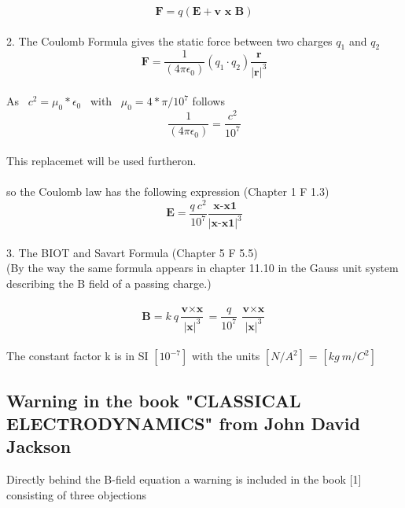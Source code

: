 \documentclass[10pt,titlepage]{article}
\begin{document}
\begin{equation}
\textbf{F} = q(\textbf{E}+\textbf{v }\textbf{x}\textbf{ B})
\end{equation}
\\
2. The Coulomb Formula gives the static force between two charges $q_1$ and $q_2$ 
\\
\begin{equation}
\textbf{F} = \frac{1}{(4\pi \epsilon_0)} (q_1 \cdot q_2)\frac{\textbf{r}}{\vert\textbf{r}\vert^3}
\end{equation}
\\
As \ $c^2=\mu_0* \epsilon_0$ \ with \ $ \mu_0=4*\pi/10^7$ follows
\begin{equation}
\frac{1}{(4\pi \epsilon_0)}=\frac{c^2}{10^7}
\end{equation}\\
This replacemet will be used furtheron.
\\\\
so the Coulomb law has the following expression (Chapter 1  F 1.3)
\begin{equation}
\textbf{E} = \frac{ q \ c^2}{10^7}\frac{\textbf{x-x1}}{\vert\textbf{x-x1}\vert^3}
\end{equation}\\


3. The BIOT and Savart Formula (Chapter 5  F 5.5)
\\(By the way the same formula appears in chapter 11.10 in the Gauss unit system describing the B field of a passing charge.)\\
\\
\begin{equation}
\textbf{B} = k \ q \frac{\textbf{v} \times \textbf{x}}{\vert\textbf{x}\vert^3} = \frac{q}{10^{7}} \ \frac{\textbf{v} \times \textbf{x}}{\vert\textbf{x}\vert^3}
\end{equation}
\\
The constant factor k is in SI  $[10^{-7}]$ with the units $[N/A^2]$ =  $[kg \ m/C^2]$
\\


\subsection{Warning in the book "CLASSICAL ELECTRODYNAMICS" from John David Jackson}
Directly behind the B-field equation a warning is included in the book [1] consisting of three objections
\end{document}
